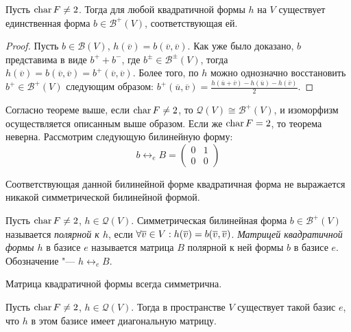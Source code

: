 \begin{theorem}
	Пусть $\operatorname{char}{F} \ne 2$. Тогда для любой квадратичной формы $h$ на $V$ существует единственная форма $b \in \mathcal{B}^+(V)$, соответствующая ей.
\end{theorem}

\begin{proof}
	Пусть $b \in \mathcal{B}(V)$, $h(\overline{v}) = b(\overline{v}, \overline{v})$. Как уже было доказано, $b$ представима в виде $b^+ + b^-$, где $b^\pm \in \mathcal{B}^\pm(V)$, тогда $h(\overline{v}) = b(\overline{v}, \overline{v}) = b^+(\overline{v}, \overline{v})$. Более того, по $h$ можно однозначно восстановить $b^+ \in \mathcal{B}^+(V)$ следующим образом: $b^+(\overline{u}, \overline{v}) = \frac{h(\overline{u} + \overline{v}) - h(\overline{u}) - h(\overline{v})}{2}$.
\end{proof}

\begin{note}
	Согласно теореме выше, если $\operatorname{char}{F} \ne 2$, то $\mathcal{Q}(V) \cong \mathcal{B}^+(V)$, и изоморфизм осуществляется описанным выше образом. Если же $\operatorname{char}{F} = 2$, то теорема неверна. Рассмотрим следующую билинейную форму:
	\[b \leftrightarrow_e B = \begin{pmatrix}0&1\\0&0\end{pmatrix}\]
	
	Соответствующая данной билинейной форме квадратичная форма не выражается никакой симметрической билинейной формой.
\end{note}

\begin{definition}
	Пусть $\operatorname{char}{F} \ne 2$, $h \in \mathcal{Q}(V)$. Симметрическая билинейная форма $b \in \mathcal{B}^+(V)$ называется \textit{полярной к $h$}, если $\forall \overline{v} \hm{\in} V: h(\overline{v}) = b(\overline{v}, \overline{v})$. \textit{Матрицей квадратичной формы $h$} в базисе $e$ называется матрица $B$ полярной к ней формы $b$ в базисе $e$. Обозначение "--- $h \leftrightarrow_e B$.
\end{definition}

\begin{note}
	Матрица квадратичной формы всегда симметрична.
\end{note}

\begin{theorem}
	Пусть $\operatorname{char}{F} \ne 2$, $h \in \mathcal{Q}(V)$. Тогда в пространстве $V$ существует такой базис $e$, что $h$ в этом базисе имеет диагональную матрицу.
\end{theorem}

